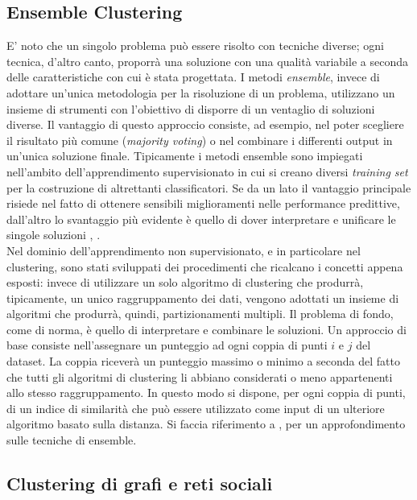 \subsection{Ensemble Clustering}
E' noto che un singolo problema pu\`o essere risolto con tecniche diverse; ogni tecnica, d'altro canto, proporr\`a una soluzione con una qualit\`a variabile a seconda delle caratteristiche con cui \`e stata progettata. I metodi \textit{ensemble}, invece di adottare un'unica metodologia per la risoluzione di un problema, utilizzano un insieme di strumenti con l'obiettivo di disporre di un ventaglio di soluzioni diverse. Il vantaggio di questo approccio consiste, ad esempio, nel poter scegliere il risultato pi\`u comune (\textit{majority voting}) o nel combinare i differenti output in un'unica soluzione finale. Tipicamente i metodi ensemble sono impiegati nell'ambito dell'apprendimento supervisionato in cui si creano diversi \textit{training set} per la costruzione di altrettanti classificatori. Se da un lato il vantaggio principale risiede nel fatto di ottenere sensibili miglioramenti nelle performance predittive, dall'altro lo svantaggio pi\`u evidente \`e quello di dover interpretare e unificare le singole soluzioni \cite{Dietterich2000}, \cite{Rokach2010}.\\
Nel dominio dell'apprendimento non supervisionato, e in particolare nel clustering, sono stati sviluppati dei procedimenti che ricalcano i concetti appena esposti: invece di utilizzare un solo algoritmo di clustering che produrr\`a, tipicamente, un unico raggruppamento dei dati, vengono adottati un insieme di algoritmi che produrr\`a, quindi, partizionamenti multipli. Il problema di fondo, come di norma, \`e quello di interpretare e combinare le soluzioni. Un approccio di base consiste nell'assegnare un punteggio ad ogni coppia di punti $ i $ e $ j $ del dataset. La coppia ricever\`a un punteggio massimo o minimo a seconda del fatto che tutti gli algoritmi di clustering li abbiano considerati o meno appartenenti allo stesso raggruppamento. In questo modo si dispone, per ogni coppia di punti, di un indice di similarit\`a che pu\`o essere utilizzato come input di un ulteriore algoritmo basato sulla distanza. Si faccia riferimento a \cite{Strehl03}, \cite{Ghaemi2009} per un approfondimento sulle tecniche di ensemble.

\subsection{Clustering di grafi e reti sociali}

